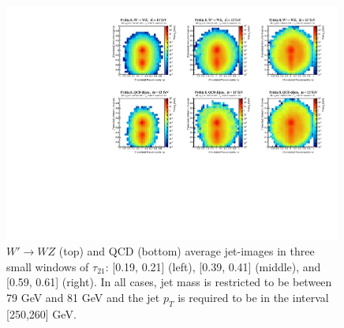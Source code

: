 \begin{figure}[bt]
  \begin{center}
  
        \includegraphics[width=0.99\textwidth]{figures/averages_fixed_nonorm.pdf}

      \caption{
        $W'\rightarrow WZ$ (top) and QCD (bottom) average jet-images in three small windows of $\tau_{21}$: [0.19, 0.21] (left), [0.39, 0.41] (middle), and [0.59, 0.61] (right).  In all cases, jet mass is restricted to be between 79 GeV and 81 GeV and the jet $p_T$ is required to be in the interval [250,260] GeV.
        \label{fig:meanImagesWindow} 
      }
    \end{center}
\end{figure}  

